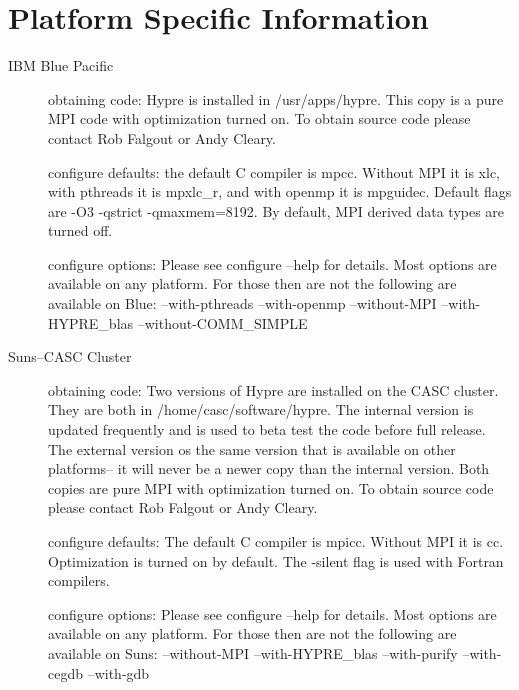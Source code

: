 \section{Platform Specific Information}
\begin{description}

\item[IBM Blue Pacific]
obtaining code:
\newline
Hypre is installed in /usr/apps/hypre.  This copy is a pure MPI code with optimization turned on.  To obtain source code please contact Rob Falgout or Andy Cleary.
\newline

configure defaults:
\newline
the default C compiler is mpcc.  Without MPI it is xlc, with pthreads it is mpxlc\_r, and with openmp it is mpguidec.  Default flags are -O3 -qstrict -qmaxmem=8192.  By default, MPI derived data types are turned off.      
\newline

configure options:
\newline
Please see configure --help for details.  Most options are available on any platform.  For those then are not the following are available on Blue:  --with-pthreads --with-openmp --without-MPI --with-HYPRE\_blas --without-COMM\_SIMPLE 
\newline


\item[Suns--CASC Cluster]
obtaining code:
\newline
Two versions of Hypre are installed on the CASC cluster.  They are both in /home/casc/software/hypre.  The internal version is updated frequently and is used to beta test the code before full release.  The external version os the same version that is available on other platforms-- it will never be a newer copy than the internal version.  Both copies are pure MPI with optimization turned on. To obtain source code please contact Rob Falgout or Andy Cleary.
\newline

configure defaults:
\newline
The default C compiler is mpicc.  Without MPI it is cc.  Optimization is turned on by default.  The -silent flag is used with Fortran compilers.  
\newline

configure options:
\newline
Please see configure --help for details.  Most options are available on any platform.  For those then are not the following are available on Suns:  --without-MPI --with-HYPRE\_blas --with-purify --with-cegdb --with-gdb
\newline


\end{description}
